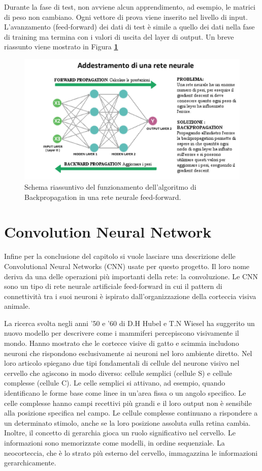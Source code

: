 Durante la fase di test, non avviene alcun apprendimento, ad esempio, le matrici di peso non cambiano. Ogni vettore di prova viene inserito nel livello di input. L'avanzamento (feed-forward) dei dati di test è simile a quello dei dati nella fase di training ma termina con i valori di uscita del layer di output. Un breve riassunto viene mostrato in Figura \textbf{\ref{fig:backpropagation}}\\

\begin{figure}
\includegraphics[width=%
1\textwidth]{figures/backpropagationsgd_mia}
\caption[Backpropagation]{Schema riassuntivo del funzionamento dell'algoritmo di Backpropagation in una rete neurale feed-forward.
\label{fig:backpropagation}}
\end{figure} 

\section{Convolution Neural Network}
Infine per la conclusione del capitolo si vuole lasciare una descrizione delle Convolutional Neural Networks (CNN) usate per questo progetto. Il loro nome deriva da una delle operazioni più importanti della rete: la convoluzione. Le CNN sono un tipo di rete neurale artificiale feed-forward in cui il pattern di connettività tra i suoi neuroni è ispirato dall'organizzazione della corteccia visiva animale.

La ricerca svolta negli anni '50 e '60 di D.H Hubel e T.N Wiesel \cite{Hubel1968} ha suggerito un nuovo modello per descrivere come i mammiferi percepiscono visivamente il mondo. Hanno mostrato che le cortecce visive di gatto e scimmia includono neuroni che rispondono esclusivamente ai neuroni nel loro ambiente diretto.
Nel loro articolo spiegano due tipi fondamentali di cellule del neurone visivo nel cervello che agiscono in modo diverso: cellule semplici (cellule S) e cellule complesse (cellule C).
Le celle semplici si attivano, ad esempio, quando identificano le forme base come linee in un'area fissa o un angolo specifico. Le celle complesse hanno campi recettivi più grandi e il loro output non è sensibile alla posizione specifica nel campo.
Le cellule complesse continuano a rispondere a un determinato stimolo, anche se la loro posizione assoluta sulla retina cambia.
Inoltre, il concetto di gerarchia gioca un ruolo significativo nel cervello. Le informazioni sono memorizzate come modelli, in ordine sequenziale. La neocorteccia, che è lo strato più esterno del cervello, immagazzina le informazioni gerarchicamente.

